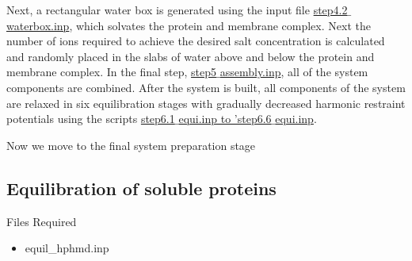 Next, a rectangular water box is generated using the input file \href{https://gitlab.com/shenlab-amber-cphmd/cphmd-tutorial/-/tree/main/memb_hphmd_charmm/initial_system_prep/step1-5}{step4.2$\_$waterbox.inp}, which solvates the protein and membrane complex.
Next the number of ions required to achieve the desired salt concentration is calculated and randomly placed in the slabs of water above and below the protein and membrane complex. 
In the final step, \href{https://gitlab.com/shenlab-amber-cphmd/cphmd-tutorial/-/tree/main/memb_hphmd_charmm/initial_system_prep/step1-5}{step5$\_$assembly.inp}, all of the system components are combined.
After the system is built, 
all components of the system are relaxed in six equilibration stages with gradually decreased harmonic restraint potentials using the scripts  \href{https://gitlab.com/shenlab-amber-cphmd/cphmd-tutorial/-/tree/main/memb_hphmd_charmm/initial_system_prep/step6}{step6.1$\_$equi.inp to 'step6.6$\_$equi.inp}.

Now we move to the final system preparation stage

\subsection{Equilibration of soluble proteins}

\begin{checklist}{Files Required}
\begin{itemize}
\item equil\_hphmd.inp
\end{itemize}
\end{checklist}

